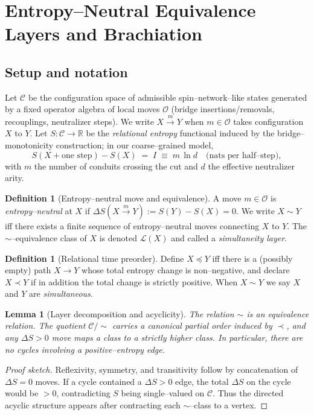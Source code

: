 \documentclass[11pt]{article}
\theoremstyle{plain}
\newtheorem{lemma}[theorem]{Lemma}
\theoremstyle{definition}
\newtheorem{definition}[theorem]{Definition}
\begin{document}
\section{Entropy–Neutral Equivalence Layers and Brachiation}

\subsection{Setup and notation}
Let $\mathcal{C}$ be the configuration space of admissible spin–network–like states generated by a fixed operator algebra of local moves $\mathcal{O}$ (bridge insertions/removals, recouplings, neutralizer steps).
We write $X \xrightarrow{\,m\,} Y$ when $m\in\mathcal{O}$ takes configuration $X$ to $Y$.
Let $S:\mathcal{C}\to\mathbb{R}$ be the \emph{relational entropy} functional induced by the bridge–monotonicity construction; in our coarse–grained model,
\[
  S(X+\text{one step})-S(X)\;=\; I \;\equiv\; m\,\ln d \quad\text{(nats per half–step)},
\]
with $m$ the number of conduits crossing the cut and $d$ the effective neutralizer arity.

\begin{definition}[Entropy–neutral move and equivalence]
  A move $m\in\mathcal{O}$ is \emph{entropy–neutral} at $X$ if $\Delta S(X\xrightarrow{m}Y):=S(Y)-S(X)=0$.
  We write $X\sim Y$ iff there exists a finite sequence of entropy–neutral moves connecting $X$ to $Y$.
  The $\sim$–equivalence class of $X$ is denoted $\mathcal{L}(X)$ and called a \emph{simultaneity layer}.
\end{definition}

\begin{definition}[Relational time preorder]
  Define $X\preceq Y$ iff there is a (possibly empty) path $X\to Y$ whose total entropy change is non–negative, and declare $X\prec Y$ if in addition the total change is strictly positive.  When $X\sim Y$ we say $X$ and $Y$ are \emph{simultaneous}.
\end{definition}

\begin{lemma}[Layer decomposition and acyclicity]\label{lem:layers}
  The relation $\sim$ is an equivalence relation.  The quotient $\mathcal{C}/\!\sim$ carries a canonical partial order induced by $\prec$, and any $\Delta S>0$ move maps a class to a strictly higher class.  In particular, there are no cycles involving a positive–entropy edge.
\end{lemma}

\begin{proof}[Proof sketch]
  Reflexivity, symmetry, and transitivity follow by concatenation of $\Delta S=0$ moves.
  If a cycle contained a $\Delta S>0$ edge, the total $\Delta S$ on the cycle would be $>0$, contradicting $S$ being single–valued on $\mathcal{C}$.
  Thus the directed acyclic structure appears after contracting each $\sim$–class to a vertex.
\end{proof}
\end{document}
